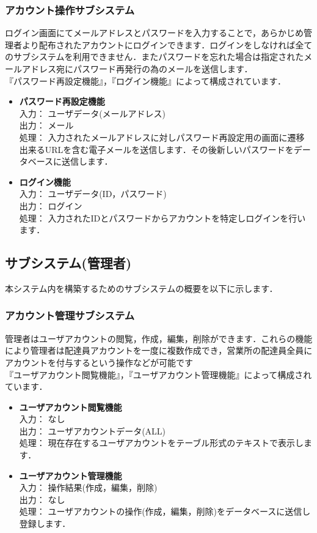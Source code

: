 \documentclass[a4j,titlepage]{jarticle}
\begin{document}
\subsubsection{アカウント操作サブシステム}
ログイン画面にてメールアドレスとパスワードを入力することで，あらかじめ管理者より配布されたアカウントにログインできます．ログインをしなければ全てのサブシステムを利用できません．またパスワードを忘れた場合は指定されたメールアドレス宛にパスワード再発行の為のメールを送信します． \\
『パスワード再設定機能』，『ログイン機能』によって構成されています．
\begin{itemize}
\item \textbf{パスワード再設定機能} \\
入力： ユーザデータ(メールアドレス) \\
出力： メール\\
処理： 入力されたメールアドレスに対しパスワード再設定用の画面に遷移出来るURLを含む電子メールを送信します．その後新しいパスワードをデータベースに送信します．
\item \textbf{ログイン機能} \\
入力： ユーザデータ(ID，パスワード) \\
出力： ログイン \\
処理： 入力されたIDとパスワードからアカウントを特定しログインを行います．
\end{itemize}


\subsection{サブシステム(管理者)}
本システム内を構築するためのサブシステムの概要を以下に示します．

\subsubsection{アカウント管理サブシステム}
管理者はユーザアカウントの閲覧，作成，編集，削除ができます．これらの機能により管理者は配達員アカウントを一度に複数作成でき，営業所の配達員全員にアカウントを付与するという操作などが可能です\\
『ユーザアカウント閲覧機能』，『ユーザアカウント管理機能』によって構成されています．
\begin{itemize}
\item \textbf{ユーザアカウント閲覧機能} \\
入力： なし \\
出力： ユーザアカウントデータ(ALL) \\
処理： 現在存在するユーザアカウントをテーブル形式のテキストで表示します．
\item \textbf{ユーザアカウント管理機能} \\
入力： 操作結果(作成，編集，削除) \\
出力： なし \\
処理： ユーザアカウントの操作(作成，編集，削除)をデータベースに送信し登録します．
\end{itemize}
\end{document}
